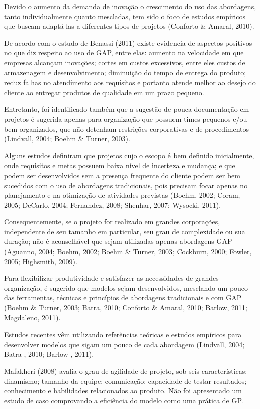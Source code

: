Devido o aumento da demanda de inovação o crescimento do uso das abordagens, tanto individualmente quanto mescladas, tem sido o foco de estudos empíricos que buscam adaptá-las a diferentes tipos de projetos (Conforto \& Amaral, 2010).

De acordo com o estudo de Benassi (2011) existe evidencia de aspectos positivos no que diz respeito ao uso de GAP, entre elas: aumento na velocidade em que empresas alcançam inovações; cortes em custos excessivos, entre eles custos de armazenagem e desenvolvimento; diminuição do tempo de entrega do produto; reduz falhas no atendimento aos requisitos e portanto atende melhor ao desejo do cliente ao entregar produtos de qualidade em um prazo pequeno.

Entretanto, foi identificado também que a sugestão de pouca documentação em projetos é sugerida apenas para organização que possuem times pequenos e/ou bem organizados, que não detenham restrições corporativas e de procedimentos (Lindvall, 2004; Boehm \& Turner, 2003).

Alguns estudos definiram que projetos cujo o escopo é bem definido inicialmente, onde requisitos e metas possuem baixa nível de incerteza e mudança; e que podem ser desenvolvidos sem a presença frequente do cliente podem ser bem sucedidos com o uso de abordagens tradicionais, pois precisam focar apenas no planejamento e na otimização de atividades previstas (Boehm, 2002; Coram, 2005; DeCarlo, 2004; Fernandez, 2008; Shenhar, 2007; Wysocki, 2011).

Consequentemente, se o projeto for realizado em grandes corporações, independente de seu tamanho em particular, seu grau de complexidade ou sua duração; não é aconselhável que sejam utilizadas apenas abordagens GAP (Aguanno, 2004; Boehm, 2002; Boehm \& Turner, 2003; Cockburn, 2000; Fowler, 2005; Highsmith, 2009).

Para flexibilizar produtividade e satisfazer as necessidades de grandes organização, é sugerido que modelos sejam desenvolvidos, mesclando um pouco das ferramentas, técnicas e princípios de abordagens tradicionais e com GAP (Boehm \& Turner, 2003; Batra, 2010; Conforto \& Amaral, 2010; Barlow, 2011; Magdaleno, 2011).

Estudos recentes vêm utilizando referências teóricas e estudos empíricos para desenvolver modelos que sigam um pouco de cada abordagem (Lindvall, 2004; Batra , 2010; Barlow , 2011).

Mafakheri (2008) avalia o grau de agilidade de projeto, sob seis características: dinamismo; tamanho da equipe; comunicação; capacidade de testar resultados; conhecimento e habilidades relacionados ao produto. Não foi apresentado um estudo de caso comprovando a eficiência do modelo como uma prática de GP.


